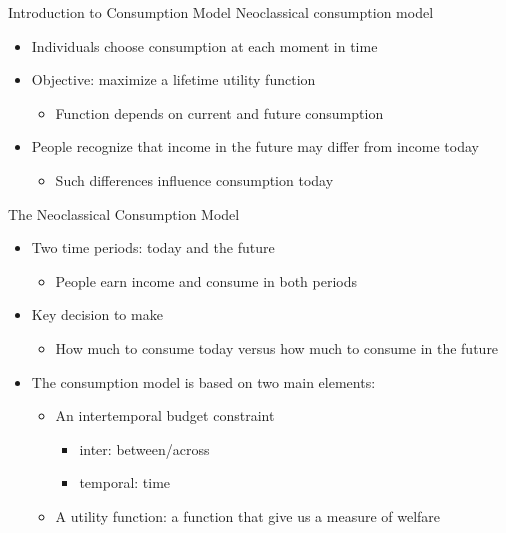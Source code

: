 \documentclass[aspectratio=1610]{beamer}
\begin{document}
\begin{frame}[wide]{Introduction to Consumption Model}
	Neoclassical consumption model
	\vspace{2mm}
	\begin{itemize}
		\item Individuals choose consumption at each moment in time
		\item Objective: maximize a lifetime utility function 
		\vspace{1mm}
		\begin{itemize}
			\item Function depends on current and future consumption
		\end{itemize}
		\item People recognize that income in the future may differ from income today
		\vspace{1mm}
		\begin{itemize}
			\item Such differences influence consumption today
		\end{itemize}
	\end{itemize}
\end{frame}

\begin{frame}[wide]{The Neoclassical Consumption Model}
	\begin{itemize}
		\item Two time periods: today and the future
		\vspace{1mm}
		\begin{itemize}
			\item People earn income and consume in both periods
		\end{itemize}
		\item Key decision to make
		\vspace{1mm}
		\begin{itemize}
			\item How much to consume today versus how much to consume in the future 
		\end{itemize}
		\item The consumption model is based on two main elements:
		\vspace{1mm}
		\begin{itemize}
			\item An intertemporal budget constraint
			\begin{itemize}
				\item inter: between/across
				\item temporal: time
			\end{itemize}
			\item A utility function: a function that give us a measure of welfare
			
		\end{itemize}
	\end{itemize}
\end{frame}
\end{document}
